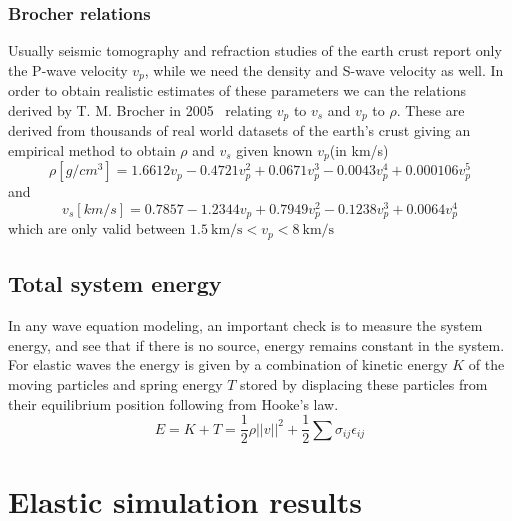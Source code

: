 \documentclass[fleqn,11pt]{SelfArx} %
\theoremstyle{definition}
\begin{document}
\subsubsection{Brocher relations}
Usually seismic tomography and refraction studies of the earth crust report only the P-wave velocity $v_p$, while we need the density and S-wave velocity as well.
 In order to obtain realistic estimates of these parameters we can the relations derived by T. M. Brocher in 2005~\cite{Brocher2005} relating $v_p$ to $v_s$ and $v_p$ to $\rho$. These are derived from thousands of real world datasets of the earth's crust giving an empirical method to obtain $\rho$ and $v_s$ given known $v_p$(in km/s)
\begin{equation}\label{eq:brochers_rho}
\rho[g/cm^3] = 1.6612v_p - 0.4721v_p^2 + 0.0671v_p^3 - 0.0043 v_p^4 + 0.000106 v_p^5
\end{equation}
and 
\begin{equation}\label{eq:brochers_vs}
v_s[km/s] = 0.7857 - 1.2344v_p + 0.7949v_p^2 - 0.1238v_p^3 + 0.0064 v_p^4
\end{equation}
which are only valid between $1.5 \ \text{km/s} < v_p < 8\   \text{km/s}$ 
\subsection{Total system energy}
In any wave equation modeling, an important check is to measure the system energy, and see that if there is no source, energy remains constant in the system.
For elastic waves the energy is given by a combination of kinetic energy $K$ of the moving particles and spring energy $T$ stored by displacing these particles from their equilibrium position following from Hooke's law.
\begin{equation}\label{eq:elastic_system_energy}
E = K + T = \frac{1}{2}\rho ||v||^2 + \frac{1}{2}\sum\sigma_{ij}\epsilon_{ij}
\end{equation}



\section{Elastic simulation results}
\end{document}
